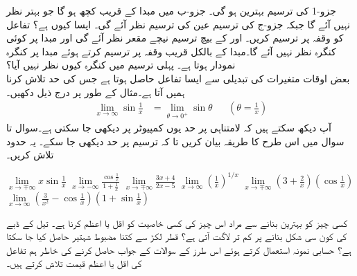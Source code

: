 جزو-1 کی ترسیم بہترین ہو گی۔ جزو-ب میں مبدا کے قریب کچھ ہو گا جو بہتر نظر نہیں آئے گا جبکہ جزو-ج کی ترسیم عین  کی ترسیم نظر آئے گی۔ ایسا کیوں ہے؟
تفاعل  کو وقفہ  پر ترسیم کریں۔   اور   کے بیچ ترسیم  نیچے مقعر نظر آئے گی اور مبدا پر کوئی کنگرہ نظر نہیں آئے گا۔مبدا کے بالکل قریب وقفہ پر ترسیم کرتے ہوئے مبدا پر کنگرہ نمودار ہوتا ہے۔ پہلی ترسیم میں کنگرہ کیوں نظر نہیں آیا؟ 
\\
بعض اوقات متغیرات کی تبدیلی سے ایسا تفاعل حاصل ہوتا ہے جس کی حد  تلاش کرنا ہمیں آتا ہے۔مثال کے طور پر  درج ذیل دکھیں۔
\begin{align*}
\lim\limits_{x\to\infty}\sin\tfrac{1}{x}&=\lim\limits_{\theta\to0^+}\sin\theta&& (\theta=\tfrac{1}{x})
\end{align*}
آپ دیکھ سکتے ہیں کہ لامتناہی پر حد  یوں کمپیوٹر پر دیکھی جا سکتی ہے۔سوال  تا سوال  میں  اس طرح کا طریقہ بیان کریں تا کہ ترسیم پر حد  دیکھی جا سکے۔ یہ حدود  تلاش کریں۔

$\lim\limits_{x\to\mp\infty} x\sin\tfrac{1}{x}$
$\lim\limits_{x\to-\infty} \tfrac{\cos \tfrac{1}{x}}{1+\tfrac{1}{x}}$
$\lim\limits_{x\to\mp\infty}\tfrac{3x+4}{2x-5}$
$\lim\limits_{x\to\infty} (\tfrac{1}{x})^{1/x}$
$\lim\limits_{x\to\mp\infty} (3+\tfrac{2}{x})(\cos \tfrac{1}{x})$
$\lim\limits_{x\to\infty} (\tfrac{3}{x^2}-\cos\tfrac{1}{x})(1+\sin\tfrac{1}{x})$




کسی چیز کو بہترین بنانے سے مراد اس چیز کی کسی خاصیت کو اقل یا اعظم  کرنا ہے۔ تیل کے ڈبے کی کون سی شکل بنانے پر کم تر لاگت آتی ہے؟  قطر لکڑ سے کتنا مضبوط  شہتیر  حاصل کیا جا سکتا ہے؟ حسابی نمونہ استعمال کرتے ہوئے اس طرز کے سوالات کے جواب حاصل کرنے کی خاطر ہم تفاعل کی اقل یا اعظم قیمت تلاش کرتے ہیں۔

